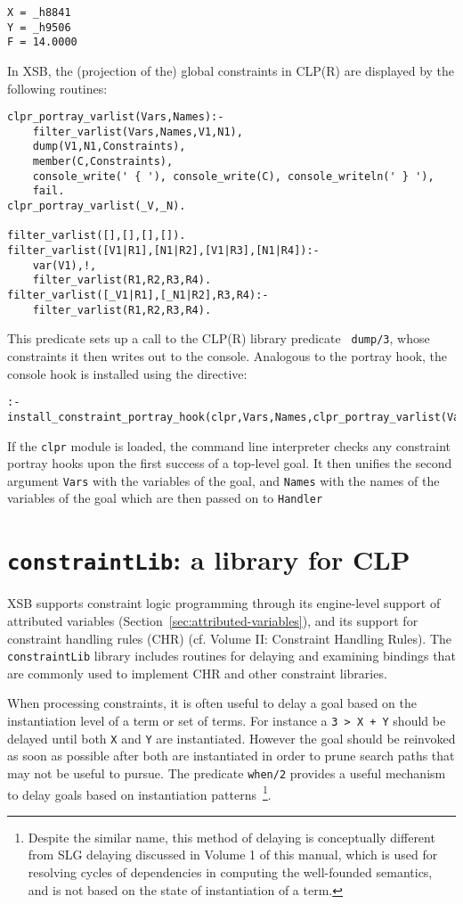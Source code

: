 \begin{description}
{\begin{verbatim}
X = _h8841
Y = _h9506
F = 14.0000
\end{verbatim}
}
%
In XSB, the (projection of the) global constraints in CLP(R) are
displayed by the following routines:
%
{\small
\begin{verbatim}
clpr_portray_varlist(Vars,Names):- 
	filter_varlist(Vars,Names,V1,N1),
	dump(V1,N1,Constraints),
	member(C,Constraints),
	console_write(' { '), console_write(C),	console_writeln(' } '),
	fail.
clpr_portray_varlist(_V,_N).

filter_varlist([],[],[],[]).
filter_varlist([V1|R1],[N1|R2],[V1|R3],[N1|R4]):- 
	var(V1),!,
	filter_varlist(R1,R2,R3,R4).
filter_varlist([_V1|R1],[_N1|R2],R3,R4):- 
	filter_varlist(R1,R2,R3,R4).
\end{verbatim}
}
%
This predicate sets up a call to the CLP(R) library predicate {\tt
  dump/3}, whose constraints it then writes out to the console.
Analogous to the portray hook, the console hook is installed using the
directive:
%
{\small
\begin{verbatim}
:- install_constraint_portray_hook(clpr,Vars,Names,clpr_portray_varlist(Vars,Names)).
\end{verbatim}
}
%
If the {\tt clpr} module is loaded, the command line interpreter
checks any constraint portray hooks upon the first success of a
top-level goal.  It then unifies the second argument {\tt Vars} with
the variables of the goal, and {\tt Names} with the names of the
variables of the goal which are then passed on to {\tt Handler}

\end{description}

\section{{\tt constraintLib}: a library for CLP} \label{constraintLib}

XSB supports constraint logic programming through its engine-level
support of attributed variables
(Section~\ref{sec:attributed-variables}), and its support for
constraint handling rules (CHR) (cf. Volume II: Constraint Handling
Rules).  The {\tt constraintLib} library includes routines for
delaying and examining bindings that are commonly used to implement
CHR and other constraint libraries.

When processing constraints, it is often useful to delay a goal based
on the instantiation level of a term or set of terms.  For instance a
{\tt 3 > X + Y} should be delayed until both {\tt X} and {\tt Y} are
instantiated.  However the goal should be reinvoked as soon as
possible after both are instantiated in order to prune search paths
that may not be useful to pursue.  The predicate {\tt when/2} provides
a useful mechanism to delay goals based on instantiation
patterns~\footnote{Despite the similar name, this method of delaying
is conceptually different from SLG {\sc delaying} discussed in Volume
1 of this manual, which is used for resolving cycles of dependencies
in computing the well-founded semantics, and is not based on the state
of instantiation of a term.}.


